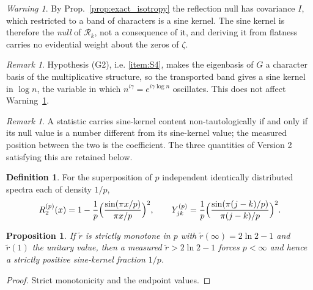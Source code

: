 \documentclass[11pt]{amsart}
\numberwithin{equation}{section}
\theoremstyle{plain}
\newtheorem{proposition}[theorem]{Proposition}
\theoremstyle{definition}
\newtheorem{definition}[theorem]{Definition}
\theoremstyle{remark}
\newtheorem{remark}[theorem]{Remark}
\newtheorem{warning}[theorem]{Warning}
\begin{document}
\begin{warning}
\label{warn:sinc_is_the_null}
By Prop.~\ref{prop:exact_isotropy} the reflection null has covariance
$I$, which restricted to a band of characters is a sine kernel. The sine
kernel is therefore the \emph{null} of $\mathcal R_k$, not a consequence
of it, and deriving it from flatness carries no evidential weight about
the zeros of $\zeta$.
\end{warning}

\begin{remark}
\label{rem:multiplicative_band}
Hypothesis (G2), i.e. \ref{item:S4}, makes the eigenbasis of $G$ a
character basis of the multiplicative structure, so the transported band
gives a sine kernel in $\log n$, the variable in which
$n^{i\gamma}=e^{i\gamma\log n}$ oscillates. This does not affect
Warning~\ref{warn:sinc_is_the_null}.
\end{remark}

\begin{remark}
\label{rem:nontautological_criterion}
A statistic carries sine-kernel content non-tautologically if and only if
its null value is a number different from its sine-kernel value; the
measured position between the two is the coefficient. The three
quantities of Version 2 satisfying this are retained below.
\end{remark}

\begin{definition}
\label{def:superposition}
For the superposition of $p$ independent identically distributed spectra
each of density $1/p$,
\begin{equation}
R_2^{(p)}(x)=1-\frac1p\Bigl(\frac{\sin(\pi x/p)}{\pi x/p}\Bigr)^{2},
\qquad
Y^{(p)}_{jk}=\frac1p\Bigl(\frac{\sin(\pi(j-k)/p)}{\pi(j-k)/p}\Bigr)^{2}.
\label{eq:superposition_matrix}
\end{equation}
\end{definition}

\begin{proposition}
\label{prop:positive_sine_fraction}
If $\tilde r$ is strictly monotone in $p$ with $\tilde r(\infty)=2\ln2-1$
and $\tilde r(1)$ the unitary value, then a measured
$\tilde r>2\ln2-1$ forces $p<\infty$ and hence a strictly positive
sine-kernel fraction $1/p$.
\end{proposition}

\begin{proof}
Strict monotonicity and the endpoint values.
\end{proof}
\end{document}
